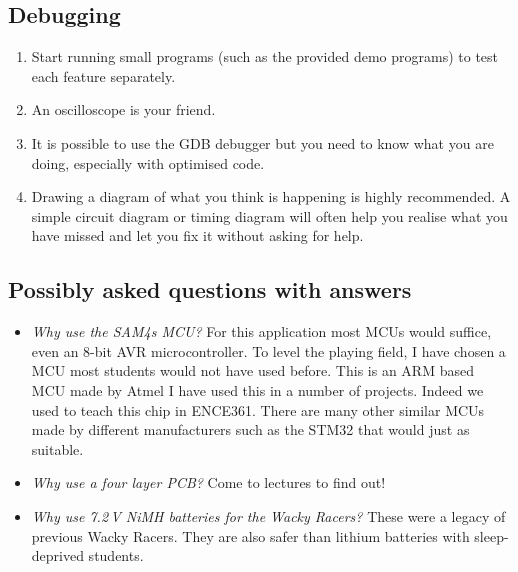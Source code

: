 \documentclass[11pt, a4paper]{article}
\begin{document}
\subsection{Debugging}

\begin{enumerate}
\item Start running small programs (such as the provided demo
  programs) to test each feature separately.
  
\item An oscilloscope is your friend.

\item It is possible to use the GDB debugger but you need to know what
  you are doing, especially with optimised code.

\item Drawing a diagram of what you think is happening is highly recommended. A
simple circuit diagram or timing diagram will often help you realise what you
have missed and let you fix it without asking for help.
  
\end{enumerate}


\subsection{Possibly asked questions with answers}

\begin{itemize}
\item \emph{Why use the SAM4s MCU?}  For this application most MCUs
  would suffice, even an 8-bit AVR microcontroller.  To level the
  playing field, I have chosen a MCU most students would not have used
  before.  This is an ARM based MCU made by Atmel I have used this in
  a number of projects.  Indeed we used to teach this chip in ENCE361.
  There are many other similar MCUs made by different manufacturers
  such as the STM32 that would just as suitable.

\item \emph{Why use a four layer PCB?}  Come to lectures to find out!

\item \emph{Why use 7.2\,V NiMH batteries for the Wacky Racers?}
  These were a legacy of previous Wacky Racers.  They are also safer
  than lithium batteries with sleep-deprived students.


\end{itemize}
\end{document}
